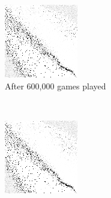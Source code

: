 \begin{figure}
	\begin{subfigure}[t]{0.2\textwidth}
	\includegraphics[width=\textwidth]{images/findings/round2/flipbook/winner/checkpoint_600000.png}
	\caption{After 600,000 games played}
	\end{subfigure}
	~
	\begin{subfigure}[t]{0.2\textwidth}
	\includegraphics[width=\textwidth]{images/findings/round2/flipbook/winner/checkpoint_800000.png}

\end{subfigure}
\end{figure}
